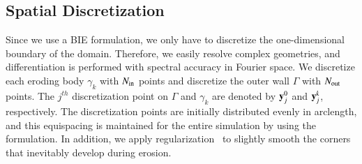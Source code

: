 \documentclass[preprint,10pt]{elsarticle}
\begin{document}
\subsection{Spatial Discretization}
\label{sec:spatialDiscretization}
Since we use a BIE formulation, we only have to discretize the
one-dimensional boundary of the domain.  Therefore, we easily resolve
complex geometries, and differentiation is performed with spectral
accuracy in Fourier space.  We discretize each eroding body $\gamma_k$
with $N_{\mathrm{in}}$ points and discretize the outer wall $\Gamma$ with
$N_{\mathrm{out}}$ points.  The $j^{th}$ discretization point on $\Gamma$ and
$\gamma_k$ are denoted by ${\mathbf{y}}_j^0$ and ${\mathbf{y}}^k_j$, respectively.  The
discretization points are initially distributed evenly in arclength, and
this equispacing is maintained for the entire simulation by using the
{\thL} formulation.  In addition, we apply
regularization~\cite{qua-moo2018} to slightly smooth the corners that
inevitably develop during erosion.
\end{document}
